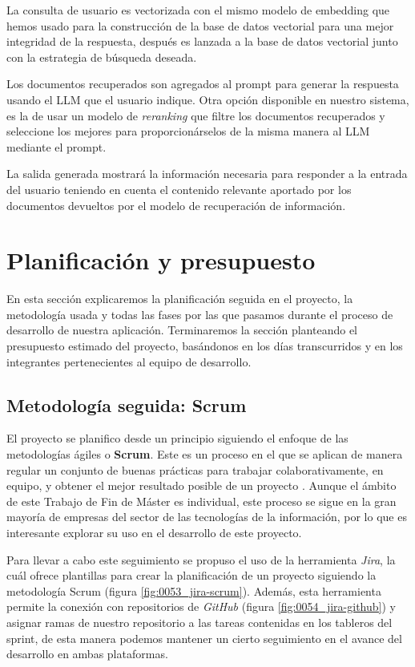        \noindent La consulta de usuario es vectorizada con el mismo modelo de embedding que hemos usado para la construcción de la base de datos vectorial para una mejor integridad de la respuesta, después es lanzada a la base de datos vectorial junto con la estrategia de búsqueda deseada.

        \noindent Los documentos recuperados son agregados al prompt para generar la respuesta usando el LLM que el usuario indique. Otra opción disponible en nuestro sistema, es la de usar un modelo de \textit{reranking} que filtre los documentos recuperados y seleccione los mejores para proporcionárselos de la misma manera al LLM mediante el prompt.

        \noindent La salida generada mostrará la información necesaria para responder a la entrada del usuario teniendo en cuenta el contenido relevante aportado por los documentos devueltos por el modelo de recuperación de información.

    \section{Planificación y presupuesto}
    
    	En esta sección explicaremos la planificación seguida en el proyecto, la metodología usada y todas las fases por las que pasamos durante el proceso de desarrollo de nuestra aplicación. Terminaremos la sección planteando el presupuesto estimado del proyecto, basándonos en los días transcurridos y en los integrantes pertenecientes al equipo de desarrollo.
    
    	\subsection{Metodología seguida: Scrum}

	        El proyecto se planifico desde un principio siguiendo el enfoque de las metodologías ágiles o \textbf{Scrum}. Este es un proceso en el que se aplican de manera regular un conjunto de buenas prácticas para trabajar colaborativamente, en equipo, y obtener el mejor resultado posible de un proyecto \cite{0028_scrum}. Aunque el ámbito de este Trabajo de Fin de Máster es individual, este proceso se sigue en la gran mayoría de empresas del sector de las tecnologías de la información, por lo que es interesante explorar su uso en el desarrollo de este proyecto.
	
	        \noindent Para llevar a cabo este seguimiento se propuso el uso de la herramienta \textit{Jira}, la cuál ofrece plantillas para crear la planificación de un proyecto siguiendo la metodología Scrum (figura \ref{fig:0053_jira-scrum}). Además, esta herramienta permite la conexión con repositorios de \textit{GitHub} (figura \ref{fig:0054_jira-github}) y asignar ramas de nuestro repositorio a las tareas contenidas en los tableros del sprint, de esta manera podemos mantener un cierto seguimiento en el avance del desarrollo en ambas plataformas.    
	

